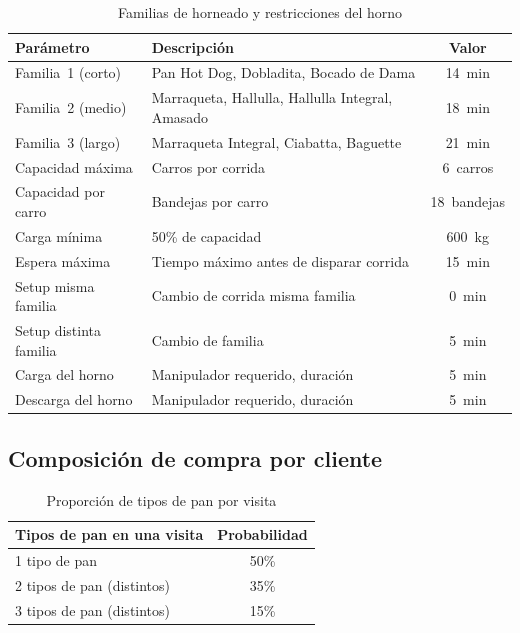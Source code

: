 \documentclass[12pt]{article}
\begin{document}
\begin{table}[H]
\centering
\caption{Familias de horneado y restricciones del horno}
\label{tab:horno-acad}
\renewcommand{\arraystretch}{1.3}
\begin{tabularx}{\textwidth}{lXc}
\toprule
\rowcolor{tabhead}
\color{white}\textbf{Parámetro} & \color{white}\textbf{Descripción} & \color{white}\textbf{Valor} \\
\midrule
\rowcolor{tabrow} Familia~1 (corto)  & Pan Hot Dog, Dobladita, Bocado de Dama & 14~min \\
Familia~2 (medio)                   & Marraqueta, Hallulla, Hallulla Integral, Amasado & 18~min \\
\rowcolor{tabrow} Familia~3 (largo)  & Marraqueta Integral, Ciabatta, Baguette & 21~min \\
Capacidad máxima                    & Carros por corrida & 6~carros \\
\rowcolor{tabrow} Capacidad por carro & Bandejas por carro & 18~bandejas \\
Carga mínima                        & 50\% de capacidad & 600~kg \\
\rowcolor{tabrow} Espera máxima      & Tiempo máximo antes de disparar corrida & 15~min \\
Setup misma familia                 & Cambio de corrida misma familia & 0~min \\
\rowcolor{tabrow} Setup distinta familia & Cambio de familia & 5~min \\
Carga del horno                     & Manipulador requerido, duración & 5~min \\
\rowcolor{tabrow} Descarga del horno  & Manipulador requerido, duración & 5~min \\
\bottomrule
\end{tabularx}
\end{table}

\subsection{Composición de compra por cliente}

\begin{table}[H]
\centering
\caption{Proporción de tipos de pan por visita}
\label{tab:mix-acad}
\renewcommand{\arraystretch}{1.3}
\begin{tabular}{lc}
\toprule
\rowcolor{tabhead}
\color{white}\textbf{Tipos de pan en una visita} & \color{white}\textbf{Probabilidad} \\
\midrule
\rowcolor{tabrow} 1 tipo de pan & 50\% \\
2 tipos de pan (distintos) & 35\% \\
\rowcolor{tabrow} 3 tipos de pan (distintos) & 15\% \\
\bottomrule
\end{tabular}
\end{table}
\end{document}
